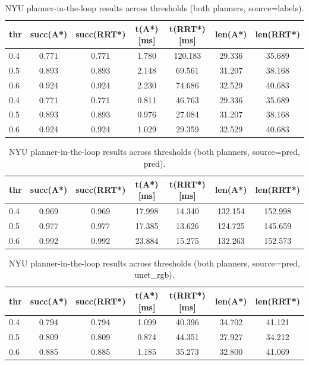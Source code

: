 \begin{table}[H]
  \centering
  \caption{NYU planner-in-the-loop results across thresholds (both planners, source=labels).}
  \label{tab:nyu_planner_labels}
  \begin{tabular}{lcccccc}
    \toprule
    thr & succ(A*) & succ(RRT*) & t(A*) [ms] & t(RRT*) [ms] & len(A*) & len(RRT*) \\ 
    \midrule
    0.4 & 0.771 & 0.771 & 1.780 & 120.183 & 29.336 & 35.689 \\
    0.5 & 0.893 & 0.893 & 2.148 & 69.561 & 31.207 & 38.168 \\
    0.6 & 0.924 & 0.924 & 2.230 & 74.686 & 32.529 & 40.683 \\
    0.4 & 0.771 & 0.771 & 0.811 & 46.763 & 29.336 & 35.689 \\
    0.5 & 0.893 & 0.893 & 0.976 & 27.084 & 31.207 & 38.168 \\
    0.6 & 0.924 & 0.924 & 1.029 & 29.359 & 32.529 & 40.683 \\
    \bottomrule
  \end{tabular}
\end{table}





\begin{table}[H]
  \centering
  \caption{NYU planner-in-the-loop results across thresholds (both planners, source=pred, pred).}
  \label{tab:nyu_planner_pred_pred}
  \begin{tabular}{lcccccc}
    \toprule
    thr & succ(A*) & succ(RRT*) & t(A*) [ms] & t(RRT*) [ms] & len(A*) & len(RRT*) \\ 
    \midrule
    0.4 & 0.969 & 0.969 & 17.998 & 14.340 & 132.154 & 152.998 \\
    0.5 & 0.977 & 0.977 & 17.385 & 13.626 & 124.725 & 145.659 \\
    0.6 & 0.992 & 0.992 & 23.884 & 15.275 & 132.263 & 152.573 \\
    \bottomrule
  \end{tabular}
\end{table}





\begin{table}[H]
  \centering
  \caption{NYU planner-in-the-loop results across thresholds (both planners, source=pred, unet_rgb).}
  \label{tab:nyu_planner_pred_unet_rgb}
  \begin{tabular}{lcccccc}
    \toprule
    thr & succ(A*) & succ(RRT*) & t(A*) [ms] & t(RRT*) [ms] & len(A*) & len(RRT*) \\ 
    \midrule
    0.4 & 0.794 & 0.794 & 1.099 & 40.396 & 34.702 & 41.121 \\
    0.5 & 0.809 & 0.809 & 0.874 & 44.351 & 27.927 & 34.212 \\
    0.6 & 0.885 & 0.885 & 1.185 & 35.273 & 32.800 & 41.069 \\
    \bottomrule
  \end{tabular}
\end{table}



